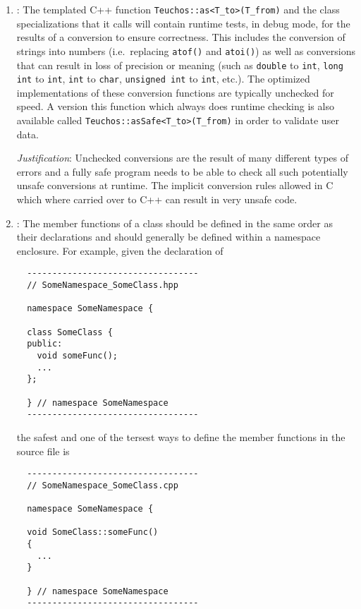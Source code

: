 \begin{enumerate}
{}\item\GCGTeuchosAs: The templated C++ function
{}\texttt{Teuchos::as<T\_to>(T\_from)} and the class specializations that it
calls will contain runtime tests, in debug mode, for the results of a
conversion to ensure correctness.  This includes the conversion of strings
into numbers (i.e.\ replacing {}\texttt{atof()} and {}\texttt{atoi()}) as well
as conversions that can result in loss of precision or meaning (such as
{}\texttt{double} to {}\texttt{int}, {}\texttt{long int} to {}\texttt{int},
{}\texttt{int} to {}\texttt{char}, {}\texttt{unsigned int} to {}\texttt{int},
etc.).  The optimized implementations of these conversion functions are
typically unchecked for speed.  A version this function which always does
runtime checking is also available called
{}\texttt{Teuchos\-::asSafe\-<\-T\_to\->\-(\-T\_from\-)} in order to validate
user data.

{}\textit{Justification}: Unchecked conversions are the result of many
different types of errors and a fully safe program needs to be able to check
all such potentially unsafe conversions at runtime.  The implicit conversion
rules allowed in C which where carried over to C++ can result in very unsafe
code.

{}\item\GCGNamespaceClassFuncDefs: The member functions of a class should be
defined in the same order as their declarations and should generally be
defined within a namespace enclosure.  For example, given the declaration of

{\small\begin{verbatim}
  ----------------------------------
  // SomeNamespace_SomeClass.hpp

  namespace SomeNamespace {

  class SomeClass {
  public:
    void someFunc();
    ...
  };

  } // namespace SomeNamespace
  ----------------------------------
\end{verbatim}}

the safest and one of the tersest ways to define the member functions in the
source file is

{\small\begin{verbatim}
  ----------------------------------
  // SomeNamespace_SomeClass.cpp

  namespace SomeNamespace {

  void SomeClass::someFunc()
  {
    ...
  }

  } // namespace SomeNamespace
  ----------------------------------
\end{verbatim}}


\end{enumerate}
